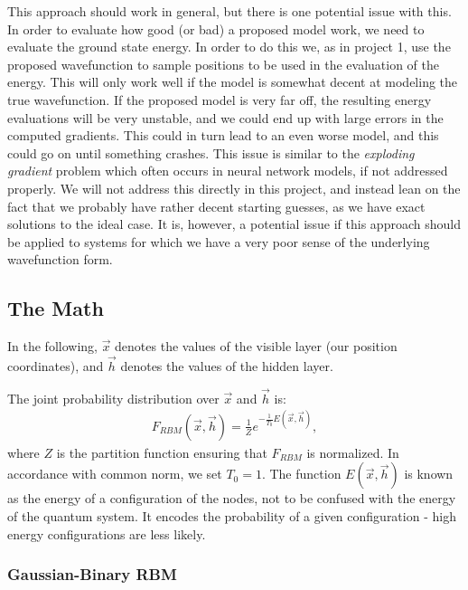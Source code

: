 \documentclass[a4paper, 11pt]{article}
\begin{document}
\begin{multicols}{2}
    This approach should work in general, but there is one potential issue with
    this. In order to evaluate how good (or bad) a proposed model work, we need
    to evaluate the ground state energy. In order to do this we, as in project
    1, use the proposed wavefunction to sample positions to be used in the
    evaluation of the energy. This will only work well if the model is somewhat
    decent at modeling the true wavefunction. If the proposed model is very far
    off, the resulting energy evaluations will be very unstable, and we could
    end up with large errors in the computed gradients. This could in turn lead
    to an even worse model, and this could go on until something crashes. This
    issue is similar to the \emph{exploding gradient} problem which often occurs
    in neural network models, if not addressed properly. We will not address
    this directly in this project, and instead lean on the fact that we probably
    have rather decent starting guesses, as we have exact solutions to the ideal
    case. It is, however, a potential issue if this approach should be applied
    to systems for which we have a very poor sense of the underlying
    wavefunction form.

    \subsection{The Math}
    
    In the following, $\vec x$ denotes the values of the visible layer (our
    position coordinates), and $\vec h$ denotes the values of the hidden layer.

    The joint probability distribution over $\vec x$ and $\vec h$ is:
    \begin{align}
        F_{RBM}(\vec x, \vec h) = \frac{1}{Z} e^{-\frac{1}{T_0}E(\vec x, \vec
        h)}\label{eq:F-RBM-def},
    \end{align}
    where $Z$ is the partition function ensuring that $F_{RBM}$ is normalized.
    In accordance with common norm, we set $T_0=1$. The function $E(\vec x, \vec
    h)$ is known as the energy of a configuration of the nodes, not to be
    confused with the energy of the quantum system. It encodes the probability
    of a given configuration - high energy configurations are less likely.

    \subsubsection{Gaussian-Binary RBM}


\end{multicols}
\end{document}
